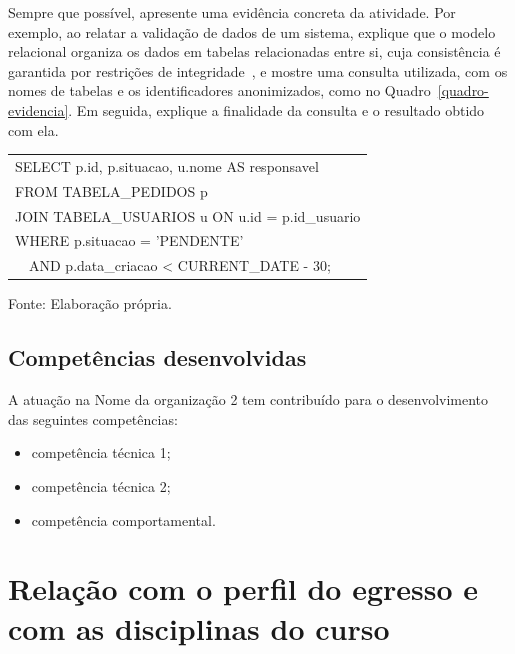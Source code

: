 \documentclass[memorial,capa]{texifsap}
\begin{document}
Sempre que possível, apresente uma evidência concreta da atividade. Por
exemplo, ao relatar a validação de dados de um sistema, explique que o
modelo relacional organiza os dados em tabelas relacionadas entre si,
cuja consistência é garantida por restrições de
integridade~\cite{Elmasri:2018}, e mostre uma consulta utilizada, com os
nomes de tabelas e os identificadores anonimizados, como no
Quadro~\ref{quadro-evidencia}. Em seguida, explique a finalidade da
consulta e o resultado obtido com ela.

\begin{quadro}[htbp]
\caption{Exemplo de consulta SQL utilizada na validação de dados (nomes anonimizados)}
\label{quadro-evidencia}
\centering\begin{tabular}{|p{12cm}|}
\hline
{\ttfamily\small SELECT p.id, p.situacao, u.nome AS responsavel}\\
{\ttfamily\small FROM TABELA\_PEDIDOS p}\\
{\ttfamily\small JOIN TABELA\_USUARIOS u ON u.id = p.id\_usuario}\\
{\ttfamily\small WHERE p.situacao = 'PENDENTE'}\\
{\ttfamily\small \ \ AND p.data\_criacao < CURRENT\_DATE - 30;}\\
\hline
\end{tabular}
\begin{flushleft}
{\small Fonte: Elaboração própria.}
\end{flushleft}
\end{quadro}

\section{Competências desenvolvidas}

A atuação na Nome da organização 2 tem contribuído para o
desenvolvimento das seguintes competências:
\begin{itemize}
\item competência técnica 1;
\item competência técnica 2;
\item competência comportamental.
\end{itemize}

\chapter{Relação com o perfil do egresso e com as disciplinas do curso}
\label{cap:egresso}
\end{document}
